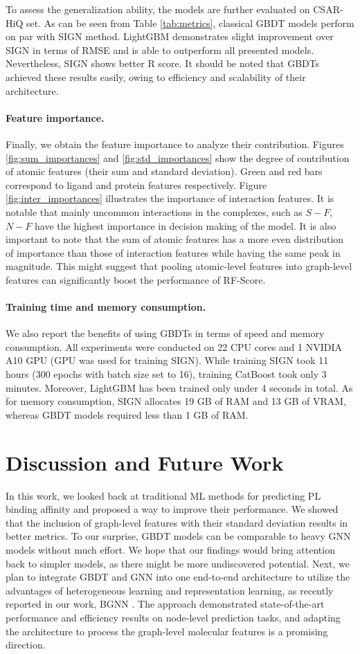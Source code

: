 \documentclass[nohyperref]{article}
\theoremstyle{plain}
\theoremstyle{definition}
\theoremstyle{remark}
\begin{document}
To assess the generalization ability, the models are further evaluated on CSAR-HiQ set. As can be seen from Table \ref{tab:metrics}, classical GBDT models perform on par with SIGN method. LightGBM demonstrates slight improvement over SIGN in terms of RMSE and is able to outperform all presented models. Nevertheless, SIGN shows better R score. It should be noted that GBDTs achieved these results easily, owing to efficiency and scalability of their architecture. 
\paragraph{Feature importance.}
Finally, we obtain the feature importance to analyze their contribution. Figures \ref{fig:sum_importances} and \ref{fig:std_importances} show the degree of contribution of atomic features (their sum and standard deviation). Green and red bars correspond to ligand and protein features respectively. Figure \ref{fig:inter_importances} illustrates the importance of interaction features. It is notable that mainly uncommon interactions in the complexes, such as $S-F$, $N-F$ have the highest importance in decision making of the model. It is also important to note that the sum of atomic features has a more even distribution of importance than those of interaction features while having the same peak in magnitude. This might suggest that pooling atomic-level features into graph-level features can significantly boost the performance of RF-Score.  
\paragraph{Training time and memory consumption.}
\label{par:training}
We also report the benefits of using GBDTs in terms of speed and memory consumption. All experiments were conducted on 22 CPU cores and 1 NVIDIA A10 GPU (GPU was used for training SIGN). While training SIGN took 11 hours (300 epochs with batch size set to 16), training CatBoost took only 3 minutes. Moreover, LightGBM has been trained only under 4 seconds in total. As for memory consumption, SIGN allocates 19 GB of RAM and 13 GB of VRAM, whereas GBDT models required less than 1 GB of RAM.

\section{Discussion and Future Work}
In this work, we looked back at traditional ML methods for predicting PL binding affinity and proposed a way to improve their performance. We showed that the inclusion of graph-level features with their standard deviation results in better metrics. To our surprise, GBDT models can be comparable to heavy GNN models without much effort. We hope that our findings would bring attention back to simpler models, as there might be more undiscovered potential. 
Next, we plan to integrate GBDT and GNN into one end-to-end architecture to utilize the advantages of heterogeneous learning and representation learning, as recently reported in our work, BGNN \cite{ivanov2021}. The approach demonstrated state-of-the-art performance and efficiency results on node-level prediction tasks, and adapting the architecture to process the graph-level molecular features is a promising direction.



\end{document}
